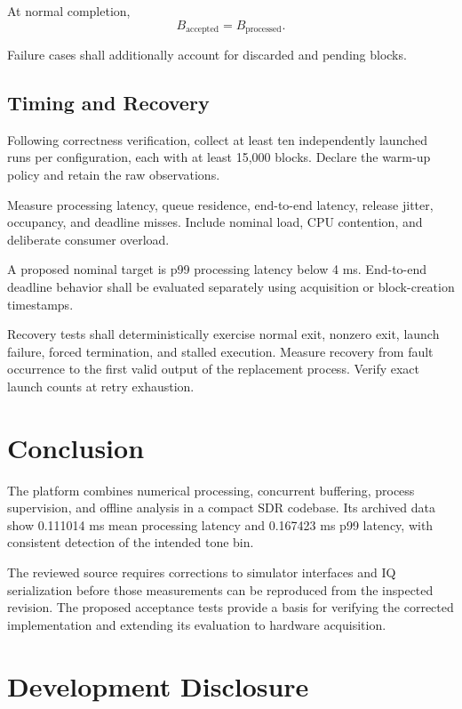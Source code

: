 \documentclass[conference]{IEEEtran}
\begin{document}
At normal completion,
\begin{equation}
B_{\mathrm{accepted}}=B_{\mathrm{processed}}.
\end{equation}

Failure cases shall additionally account for discarded
and pending blocks.

\subsection{Timing and Recovery}

Following correctness verification, collect at least ten
independently launched runs per configuration, each with
at least 15,000 blocks. Declare the warm-up policy and
retain the raw observations.

Measure processing latency, queue residence, end-to-end
latency, release jitter, occupancy, and deadline misses.
Include nominal load, CPU contention, and deliberate
consumer overload.

A proposed nominal target is p99 processing latency below
4 ms. End-to-end deadline behavior shall be evaluated
separately using acquisition or block-creation timestamps.

Recovery tests shall deterministically exercise normal
exit, nonzero exit, launch failure, forced termination,
and stalled execution. Measure recovery from fault
occurrence to the first valid output of the replacement
process. Verify exact launch counts at retry exhaustion.

\section{Conclusion}

The platform combines numerical processing, concurrent
buffering, process supervision, and offline analysis in
a compact SDR codebase. Its archived data show
0.111014 ms mean processing latency and 0.167423 ms p99
latency, with consistent detection of the intended tone bin.

The reviewed source requires corrections to simulator
interfaces and IQ serialization before those measurements
can be reproduced from the inspected revision.
The proposed acceptance tests provide a basis for verifying
the corrected implementation and extending its evaluation
to hardware acquisition.

\section*{Development Disclosure}
\end{document}
